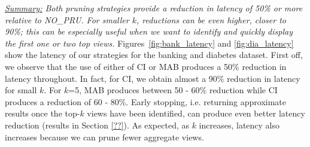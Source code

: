 

{\em \underline{Summary:} Both pruning strategies provide a reduction in latency of 50\% or more
relative to NO\_PRU. For smaller $k$, reductions can be even higher, closer to 90\%; this can be
especially useful when we want to identify and quickly display the first one or two top views.}
Figures~\ref{fig:bank_latency} and \ref{fig:dia_latency} show the latency
of our strategies for the banking and diabetes dataset.
First off, we observe that the use of either of CI or MAB produces a 50\% reduction in latency
throughout.
In fact, for CI, we obtain almost a 90\% reduction in latency for small $k$. 
For $k$=5, MAB produces between 50 - 60\% reduction while CI produces a reduction of 60 - 80\%.
Early stopping, i.e. returning approximate results once the top-$k$ views have been identified, 
can produce even better latency reduction (results in Section \ref{??}).
As expected, as $k$ increases, latency also increases because we can prune fewer aggregate views.

